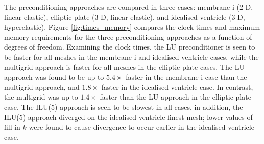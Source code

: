 \documentclass[sn-mathphys,Numbered]{sn-jnl}%
\begin{document}
The preconditioning approaches are compared in three cases: membrane i (2-D, linear elastic), elliptic plate (3-D, linear elastic), and idealised ventricle (3-D, hyperelastic).
 Figure \ref{fig:times_memory} compares the clock times and maximum memory requirements for the three preconditioning approaches as a function of degrees of freedom.
 Examining the clock times, the LU preconditioner is seen to be faster for all meshes in the membrane i and idealised ventricle cases, while the multigrid approach is faster for all meshes in the elliptic plate cases.
The LU approach was found to be up to $5.4 \times$ faster in the membrane i case than the multigrid approach, and $1.8 \times$ faster in the idealised ventricle case.
In contrast, the multigrid was up to $1.4 \times$ faster than the LU approach in the elliptic plate case.
The ILU(5) approach is seen to be slowest in all cases, in addition, the ILU(5) approach diverged on the idealised ventricle finest mesh; lower values of fill-in $k$ were found to cause divergence to occur earlier in the idealised ventricle case.
\end{document}
